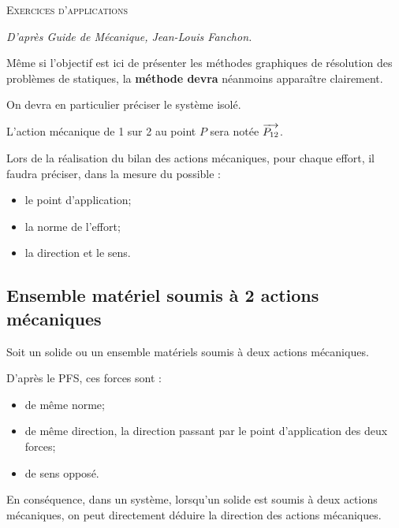 \documentclass[10pt]{article}
\begin{document}

\begin{center}
\Large{\textsc{Exercices d'applications}}
\end{center}

\begin{flushright}
\textit{D'après Guide de Mécanique, Jean-Louis Fanchon.}
\end{flushright}

\begin{rem}
Même si l'objectif est ici de présenter les méthodes graphiques de résolution des problèmes de statiques, la \textbf{méthode devra} néanmoins apparaître clairement. 

On devra en particulier préciser le système isolé. 

L'action mécanique de 1 sur 2 au point $P$ sera notée $\overrightarrow{P_{12}}$.

Lors de la réalisation du bilan des actions mécaniques, pour chaque effort, il faudra préciser, dans la mesure du possible :
\begin{itemize}
\item le point d'application;
\item la norme de l'effort;
\item la direction et le sens.
\end{itemize}
\end{rem}


\subsection*{Ensemble matériel soumis à 2 actions mécaniques}
\begin{resultat}
Soit un solide ou un ensemble matériels soumis à deux actions mécaniques. 

D'après le PFS, ces forces sont :
\begin{itemize}
\item de même norme;
\item de même direction, la direction passant par le point d'application des deux forces;
\item de sens opposé.
\end{itemize}

En conséquence, dans un système, lorsqu'un solide est soumis à deux actions mécaniques, on peut directement déduire la direction des actions mécaniques. 
\end{resultat}
\end{document}
